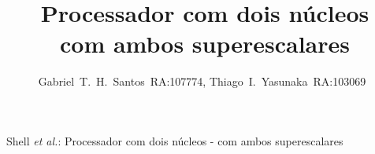 \documentclass[journal]{IEEEtran}
\begin{document}
%
\title{Processador com dois núcleos\\ com ambos superescalares}
%
%
%

\author{Gabriel~T.~H.~Santos~RA:107774, Thiago~I.~Yasunaka~RA:103069~}

% 
%



%
{Shell \MakeLowercase{\textit{et al.}}: Processador com dois núcleos - com ambos superescalares}
% 
\end{document}
